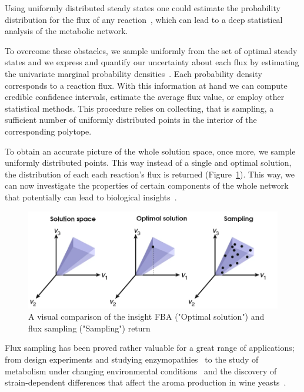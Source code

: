       Using uniformly distributed steady states one could estimate the probability
      distribution for the flux of any reaction~\cite{herrmann2019flux}, 
      which can lead to a deep statistical analysis of the metabolic network. 


      To overcome these obstacles, we sample uniformly from the set of optimal steady
      states and we express and quantify our uncertainty about each flux by estimating
      the univariate marginal probability densities~\cite{schellenberger2009use}. 
      Each probability density corresponds to a reaction flux. 
      With this information at hand we can compute credible confidence intervals, 
      estimate the average flux value, or employ other statistical methods. 
      This procedure relies on collecting, that is sampling, 
      a sufficient number of uniformly distributed points in the interior of the corresponding polytope.

      To obtain an accurate picture of the whole solution space,
      once more, we sample uniformly distributed points.
      This way instead of a single and optimal solution, 
      the distribution of each each reaction's flux is returned (Figure~\ref{fig:spaces}). 
      This way, we can now investigate the properties of certain components of the whole network 
      that potentially can lead to
      biological insights~\cite{palsson2015systems}.

      \begin{figure}[!h]
         \centering
         \includegraphics[width=.9\textwidth]{figures/solution_spaces_transparent.png}
         \caption[Flux sampling compared to FBA]{A visual comparison of the insight FBA ("Optimal solution") and flux sampling ("Sampling") return}
         \label{fig:spaces}
      \end{figure}


      Flux sampling has been proved rather valuable for a great range of applications;
      from design experiments and studying enzymopathies~\cite{price2004uniform}
      to the study of metabolism under changing environmental conditions~\cite{herrmann2019flux}
      and the discovery of strain-dependent differences 
      that affect the aroma production in wine yeasts~\cite{scott2021metabolic}. 
      
